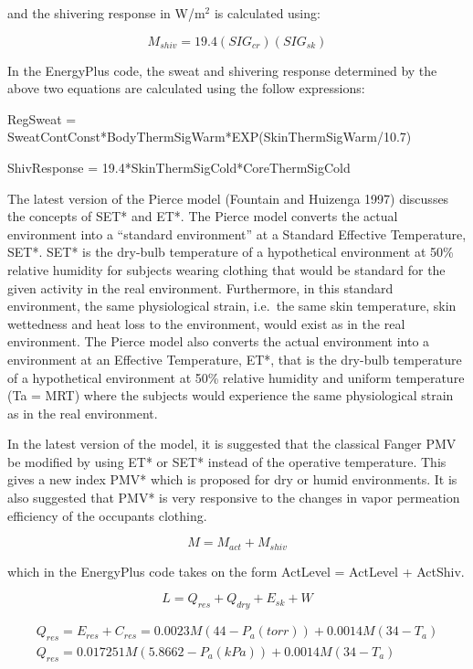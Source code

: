 and the shivering response in W/m\(^{2}\) is calculated using:

\begin{equation}
{M_{shiv}} = 19.4(SI{G_{cr}})(SI{G_{sk}})
\end{equation}

In the EnergyPlus code, the sweat and shivering response determined by the above two equations are calculated using the follow expressions:

RegSweat = SweatContConst*BodyThermSigWarm*EXP(SkinThermSigWarm/10.7)

ShivResponse = 19.4*SkinThermSigCold*CoreThermSigCold

The latest version of the Pierce model (Fountain and Huizenga 1997) discusses the concepts of SET* and ET*. The Pierce model converts the actual environment into a ``standard environment'' at a Standard Effective Temperature, SET*. SET* is the dry-bulb temperature of a hypothetical environment at 50\% relative humidity for subjects wearing clothing that would be standard for the given activity in the real environment. Furthermore, in this standard environment, the same physiological strain, i.e.~the same skin temperature, skin wettedness and heat loss to the environment, would exist as in the real environment. The Pierce model also converts the actual environment into a environment at an Effective Temperature, ET*, that is the dry-bulb temperature of a hypothetical environment at 50\% relative humidity and uniform temperature (Ta = MRT) where the subjects would experience the same physiological strain as in the real environment.

In the latest version of the model, it is suggested that the classical Fanger PMV be modified by using ET* or SET* instead of the operative temperature. This gives a new index PMV* which is proposed for dry or humid environments. It is also suggested that PMV* is very responsive to the changes in vapor permeation efficiency of the occupants clothing.

\begin{equation}
M = {M_{act}} + {M_{shiv}}
\end{equation}

which in the EnergyPlus code takes on the form ActLevel = ActLevel + ActShiv.

\begin{equation}
L = {Q_{res}} + {Q_{dry}} + {E_{sk}} + W
\end{equation}

\begin{equation}
\begin{array}{l}{Q_{res}} = {E_{res}} + {C_{res}} = 0.0023M(44 - {P_{a}(torr)}) + 0.0014M(34 - {T_a})\\{Q_{res}} = 0.017251M(5.8662 - {P_{a}(kPa)}) + 0.0014M(34 - {T_a})\end{array}
\end{equation}


